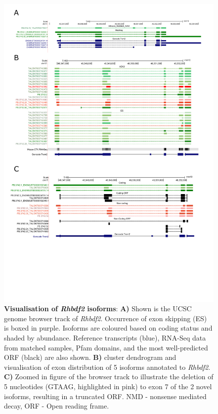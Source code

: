 \begin{landscape}
	\begin{figure}[htp]
		\begin{center}
			\includegraphics[page=7,trim={0 5cm 0 0},scale = 0.85]{Figures/pdfjoiner.pdf}
		\end{center}
		\captionsetup{width=1.5\textwidth}
		\caption[Visualisation of \textit{Rhbdf2} isoforms]%
		{\textbf{Visualisation of \textit{Rhbdf2} isoforms}: \textbf{A)} Shown is the UCSC genome browser track of \textit{Rhbdf2}. Occurrence of exon skipping (ES) is boxed in purple. Isoforms are coloured based on coding status and shaded by abundance. Reference transcripts (blue), RNA-Seq data from matched samples, Pfam domains, and the most well-predicted ORF (black) are also shown. \textbf{B)} cluster dendrogram and visualisation of exon distribution of 5 isoforms annotated to \textit{Rhbdf2}. \textbf{C)} Zoomed in figure of the browser track to illustrate the deletion of 5 nucleotides (GTAAG, highlighted in pink) to exon 7 of the 2 novel isoforms, resulting in a truncated ORF. NMD - nonsense mediated decay, ORF - Open reading frame.}   
		\label{fig:rhbdf2}
	\end{figure}
\end{landscape}

